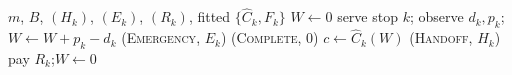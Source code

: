 \documentclass[preprint,authoryear,12pt]{elsarticle}
\theoremstyle{definition}
\theoremstyle{remark}
\begin{document}
\begin{algorithm}[t]
\caption{\textsc{Baton} online phase: priced-action trigger}
\label{alg:online}
\begin{algorithmic}[1]
\Require $m$, $B$, $(H_k)$, $(E_k)$, $(R_k)$, fitted
         $\{\widehat C_k, F_k\}$
\State $W \gets 0$
  \State serve stop $k$; observe $d_k, p_k$;\quad $W \gets W + p_k - d_k$
   \Return (\textsc{Emergency}, $E_k$) \EndIf
   \Return (\textsc{Complete}, $0$) \EndIf
  \State $c \gets \widehat C_k(W)$
       \Return (\textsc{Handoff}, $H_k$) \EndIf
       \State pay $R_k$;\quad $W \gets 0$
  \EndIf
\EndFor
\end{algorithmic}
\end{algorithm}
\end{document}
